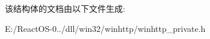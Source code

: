 \begin{DoxyCompactItemize}
\begin{tabbing}
\end{tabbing}\end{DoxyCompactItemize}


该结构体的文档由以下文件生成\+:\begin{DoxyCompactItemize}
\item 
E\+:/\+React\+O\+S-\/0../dll/win32/winhttp/winhttp\+\_\+private.\+h\end{DoxyCompactItemize}
